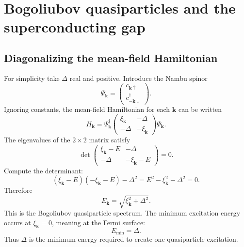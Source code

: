 \documentclass[11pt]{article}
\newcommand{\bk}{{\bm{k}}}
\begin{document}
\section{Bogoliubov quasiparticles and the superconducting gap}

\subsection{Diagonalizing the mean-field Hamiltonian}
For simplicity take $\Delta$ real and positive. Introduce the Nambu spinor
\begin{equation}
\Psi_\bk=\begin{pmatrix}c_{\bk\uparrow}\\ c_{-\bk\downarrow}^{\dagger}\end{pmatrix}.
\end{equation}
Ignoring constants, the mean-field Hamiltonian for each $\bk$ can be written
\begin{equation}
H_\bk=\Psi_\bk^{\dagger}
\begin{pmatrix}
\xi_\bk & -\Delta\\
-\Delta & -\xi_\bk
\end{pmatrix}
\Psi_\bk.
\end{equation}
The eigenvalues of the $2\times2$ matrix satisfy
\begin{equation}
\det\begin{pmatrix}
\xi_\bk-E & -\Delta\\
-\Delta & -\xi_\bk-E
\end{pmatrix}=0.
\end{equation}
Compute the determinant:
\begin{equation}
(\xi_\bk-E)(-\xi_\bk-E)-\Delta^2=E^2-\xi_\bk^2-\Delta^2=0.
\end{equation}
Therefore
\begin{equation}
 E_\bk=\sqrt{\xi_\bk^2+\Delta^2}.
\end{equation}
This is the Bogoliubov quasiparticle spectrum. The minimum excitation energy occurs at $\xi_\bk=0$, meaning at the Fermi surface:
\begin{equation}
E_{\min}=\Delta.
\end{equation}
Thus $\Delta$ is the minimum energy required to create one quasiparticle excitation.
\end{document}

